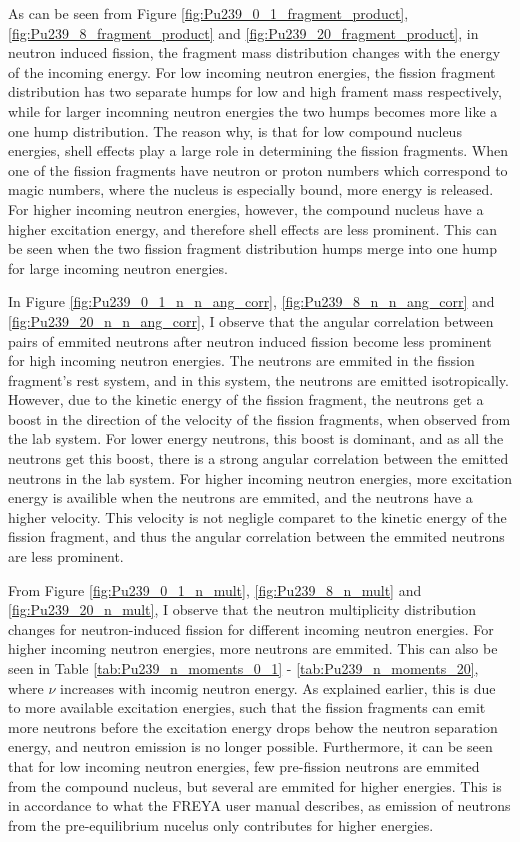 \documentclass[]{article}
\begin{document}
As can be seen from Figure \ref{fig:Pu239_0_1_fragment_product}, \ref{fig:Pu239_8_fragment_product} and \ref{fig:Pu239_20_fragment_product}, in neutron induced fission, the fragment mass distribution changes with the energy of the incoming energy. For low incoming neutron energies, the fission fragment distribution has two separate humps for low and high frament mass respectively, while for larger incomning neutron energies the two humps becomes more like a one hump distribution. The reason why, is that for low compound nucleus energies, shell effects play a large role in determining the fission fragments. When one of the fission fragments have neutron or proton numbers which correspond to magic numbers, where the nucleus is especially bound, more energy is released. For higher incoming neutron energies, however, the compound nucleus have a higher excitation energy, and therefore shell effects are less prominent. This can be seen when the two fission fragment distribution humps merge into one hump for large incoming neutron energies.\par 
\vspace{3mm}

In Figure \ref{fig:Pu239_0_1_n_n_ang_corr}, \ref{fig:Pu239_8_n_n_ang_corr} and \ref{fig:Pu239_20_n_n_ang_corr}, I observe that the angular correlation between pairs of emmited neutrons after neutron induced fission become less prominent for high incoming neutron energies. The neutrons are emmited in the fission fragment's rest system, and in this system, the neutrons are emitted isotropically. However, due to the kinetic energy of the fission fragment, the neutrons get a boost in the direction of the velocity of the fission fragments, when observed from the lab system. For lower energy neutrons, this boost is dominant, and as all the neutrons get this boost, there is a strong angular correlation between the emitted neutrons in the lab system. For higher incoming neutron energies, more excitation energy is availible when the neutrons are emmited, and the neutrons have a higher velocity. This velocity is not negligle comparet to the kinetic energy of the fission fragment, and thus the angular correlation between the emmited neutrons are less prominent.

From Figure \ref{fig:Pu239_0_1_n_mult}, \ref{fig:Pu239_8_n_mult} and \ref{fig:Pu239_20_n_mult}, I observe that the neutron multiplicity distribution changes for neutron-induced fission for different incoming neutron energies. For higher incoming neutron energies, more neutrons are emmited. This can also be seen in Table \ref{tab:Pu239_n_moments_0_1} - \ref{tab:Pu239_n_moments_20}, where $\nu$ increases with incomig neutron energy. As explained earlier, this is due to more available excitation energies, such that the fission fragments can emit more neutrons before the excitation energy drops behow the neutron separation energy, and neutron emission is no longer possible. Furthermore, it can be seen that for low incoming neutron energies, few pre-fission neutrons are emmited from the compound nucleus, but several are emmited for higher energies. This is in accordance to what the FREYA user manual describes, as emission of neutrons from the pre-equilibrium nucelus only contributes for higher energies.
\end{document}

